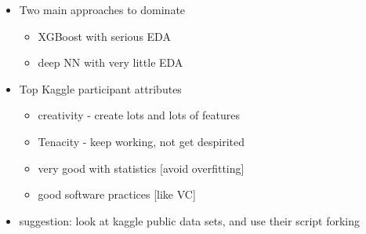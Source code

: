 \documentclass[a4paper]{report}
\begin{document}
\begin{itemize}
\begin{itemize}
      \item Two main approaches to dominate
	\begin{itemize}
	  \item XGBoost with serious EDA
	  \item deep NN with very little EDA
	\end{itemize}
      \item Top Kaggle participant attributes
	\begin{itemize}
	  \item creativity - create lots and lots of features
	  \item Tenacity - keep working, not get despirited
	  \item very good with statistics [avoid overfitting]
	  \item good software practices [like VC]
	\end{itemize}
      \item suggestion: look at kaggle public data sets, and use their script forking
    \end{itemize}
\end{itemize}
\end{document}
